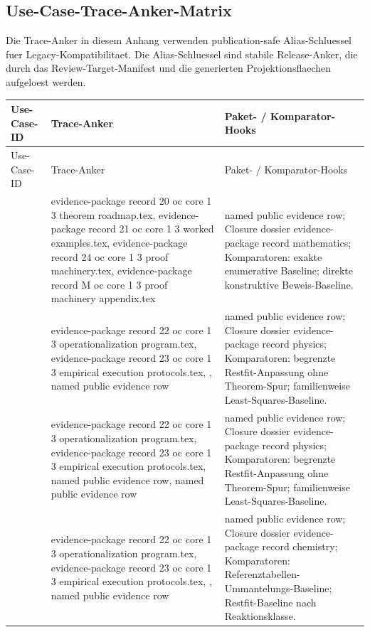 \subsection{Use-Case-Trace-Anker-Matrix}
Die Trace-Anker in diesem Anhang verwenden publication-safe Alias-Schluessel fuer Legacy-Kompatibilitaet. Die Alias-Schluessel sind stabile Release-Anker, die durch das Review-Target-Manifest und die generierten Projektionsflaechen aufgeloest werden.
\begin{longtable}{@{}L{0.16\textwidth}L{0.38\textwidth}L{0.34\textwidth}@{}}
\toprule
Use-Case-ID & Trace-Anker & Paket- / Komparator-Hooks \\
\midrule
\endfirsthead
\toprule
Use-Case-ID & Trace-Anker & Paket- / Komparator-Hooks \\
\midrule
\endhead
{} & evidence-package record 20 oc core 1 3 theorem roadmap.tex, \allowbreak evidence-package record 21 oc core 1 3 worked examples.tex, \allowbreak evidence-package record 24 oc core 1 3 proof machinery.tex, \allowbreak evidence-package record M oc core 1 3 proof machinery appendix.tex & named public evidence row; Closure dossier evidence-package record mathematics; Komparatoren: exakte enumerative Baseline; direkte konstruktive Beweis-Baseline. \\
 & evidence-package record 22 oc core 1 3 operationalization program.tex, \allowbreak evidence-package record 23 oc core 1 3 empirical execution protocols.tex, \allowbreak {}, named public evidence row & named public evidence row; Closure dossier evidence-package record physics; Komparatoren: begrenzte Restfit-Anpassung ohne Theorem-Spur; familienweise Least-Squares-Baseline. \\
 & evidence-package record 22 oc core 1 3 operationalization program.tex, \allowbreak evidence-package record 23 oc core 1 3 empirical execution protocols.tex, named public evidence row, named public evidence row & named public evidence row; Closure dossier evidence-package record physics; Komparatoren: begrenzte Restfit-Anpassung ohne Theorem-Spur; familienweise Least-Squares-Baseline. \\
 & evidence-package record 22 oc core 1 3 operationalization program.tex, \allowbreak evidence-package record 23 oc core 1 3 empirical execution protocols.tex, \allowbreak {}, named public evidence row & named public evidence row; Closure dossier evidence-package record chemistry; Komparatoren: Referenztabellen-Ummantelungs-Baseline; Restfit-Baseline nach Reaktionsklasse. \\

\end{longtable}
